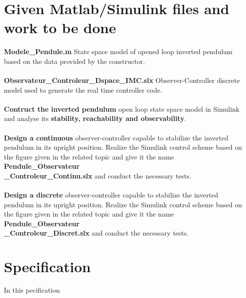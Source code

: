 \documentclass{article}
\begin{document}
\section{Given Matlab/Simulink files and work to be done}
\paragraph{}
\textbf{Modele\_Pendule.m} State space model of opened loop inverted pendulum based on the data provided by the constructor.
\paragraph{}
\textbf{Observateur\_Controleur\_Dspace\_IMC.slx} Observer-Controller discrete model used to generate the real time controller code.
\paragraph{}
\textbf{Contruct the inverted pendulum} open loop state space model in Simulink and analyse its \textbf{stability, reachability and observability}.
\paragraph{}
\textbf{Design a continuous} observer-controller capable to stabilize the inverted pendulum in its upright position. Realize the Simulink control scheme based on the figure given in the related topic and give it the name \textbf{Pendule\_Observateur\\\_Controleur\_Continu.slx} and conduct the necessary tests.
\paragraph{}
\textbf{Design a discrete} observer-controller capable to stabilize the inverted pendulum in its upright position. Realize the Simulink control scheme based on the figure given in the related topic and give it the name \textbf{Pendule\_Observateur\\\_Controleur\_Discret.slx} and conduct the necessary tests.
\section{Specification}
In this pecification
%
\end{document}
